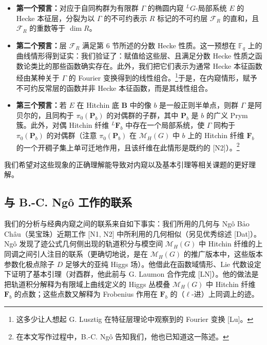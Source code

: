 \begin{itemize}[leftmargin=2em,itemsep=2pt,topsep=2pt]
\item \textbf{第一个预言：}对应于自同构群为有限群 $\Gamma$ 的椭圆内窥 ${}^{L}G$-局部系统 $E$ 的 Hecke 本征层，分裂为以 $\Gamma$ 的不可约表示 $R$ 标记的不可约层 $\mathcal{F}_R$ 的直和，且 $\mathcal{F}_R$ 的重数等于 $\dim R$。
\item \textbf{第二个预言：}层 $\mathcal{F}_R$ 满足第 6 节所述的分数 Hecke 性质。这一预想在 $\mathbb{F}_q$ 上的曲线情形得到证实：我们验证了：赋值给这些层、且满足分数 Hecke 性质之函数论类比的那些函数确实存在。此外，我们把它们表示为通常 Hecke 本征函数经由某种关于 $\Gamma$ 的 Fourier 变换得到的线性组合。\footnote{这多少让人想起 G. Lusztig 在特征层理论中观察到的 Fourier 变换 [Lu]。}于是，在内窥情形，赋予不可约反常层的函数并非 Hecke 本征函数，而是其线性组合。
\item \textbf{第三个预言：}若 $E$ 在 Hitchin 底 $\boldsymbol{B}$ 中的像 $b$ 是一般正则半单点，则群 $\Gamma$ 是阿贝尔的，且同构于 $\pi_0(\boldsymbol{P}_b)$ 的对偶群的子群，其中 $\boldsymbol{P}_b$ 是 $b$ 的广义 Prym 簇。此外，对偶 Hitchin 纤维 ${}^{L}\boldsymbol{F}_b$ 中存在一个局部系统，使 $\Gamma$ 同构于 $\pi_0(\boldsymbol{P}_b)$ 的对偶群（注意 $\pi_0(\boldsymbol{P}_b)$ 在 $\mathcal{M}_H(G)$ 中 $b$ 上的 Hitchin 纤维 $\boldsymbol{F}_b$ 的一个开稠子集上单可迁地作用，且该纤维在此情形是既约的 [N2]）。\footnote{在本文写作过程中，B.-C. Ngô 告知我们，他也已知道这一陈述。}
\end{itemize}

我们希望对这些现象的正确理解能导致对内窥以及基本引理等相关课题的更好理解。

\subsection{与 B.-C. Ngô 工作的联系}

我们的分析与经典内窥之间的联系来自如下事实：我们所用的几何与 Ngô Bảo Châu（吴宝珠）近期工作 [N1, N2] 中所利用的几何相似（另见优秀综述 [Dat]）。Ngô 发现了迹公式几何侧出现的轨道积分与模空间 $\mathcal{M}_H(G)$ 中 Hitchin 纤维的上同调之间引人注目的联系（更确切地说，是在 $\mathcal{M}_H(G)$ 的推广版本中，这些版本参数化极点除子 $D$ 足够大的亚纯 Higgs 场）。他借此在函数域情形、Lie 代数设定下证明了基本引理（对酉群，他此前与 G. Laumon 合作完成 [LN]）。他的做法是把轨道积分解释为有限域上曲线定义的 Higgs 丛模叠 $\mathcal{M}_H(G)$ 中 Hitchin 纤维 $\boldsymbol{F}_b$ 的点数；这些点数又解释为 Frobenius 作用在 $\boldsymbol{F}_b$ 的（$\ell$-进）上同调上的迹。

